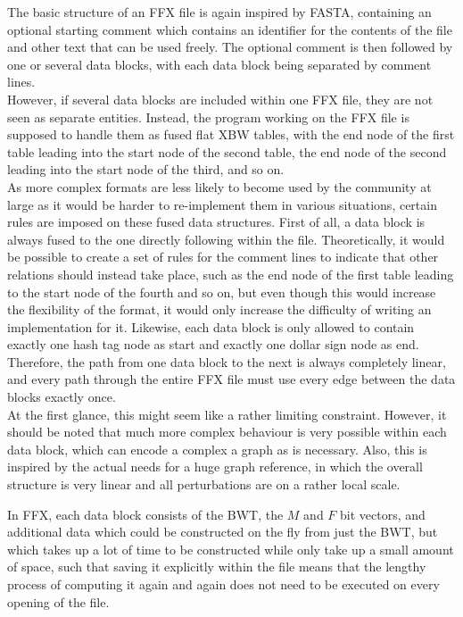 \documentclass[a4paper,12pt,twoside,BCOR=10mm]{scrbook}
\begin{document}
The basic structure of an FFX file is again inspired by FASTA, 
containing an optional starting comment which contains an identifier for 
the contents of the file and other text that can be used freely. 
The optional comment is then followed by one or several data blocks, 
with each data block being separated by comment lines. \\
However, if several data blocks are included within one FFX file, 
they are not seen as separate entities. Instead, the program working on 
the FFX file is supposed to handle them as fused flat XBW tables, 
with the end node of the first table leading into the start node of the 
second table, the end node of the second leading into the start node of the 
third, and so on. \\
As more complex formats are less likely to become 
used by the community at large as it would be harder to re-implement them 
in various situations, certain rules are imposed on these fused data structures. 
First of all, a data block is always fused to the one directly following 
within the file. 
Theoretically, it would be possible to create a set of rules for the comment 
lines to indicate that other relations should instead take place, such as the 
end node of the first table leading to the start node of the fourth and so on, 
but even though this would increase the flexibility of the format, it would only 
increase the difficulty of writing an implementation for it. 
Likewise, each data block is only allowed to contain exactly one hash tag node 
as start and exactly one dollar sign node as end. Therefore, the path from one 
data block to the next is always completely linear, and every path through the 
entire FFX file must use every edge between the data blocks exactly once. \\
At the first glance, this might seem like a rather limiting constraint. 
However, it should be noted that much more complex behaviour is very possible 
within each data block, which can encode a complex a graph as is necessary. 
Also, this is inspired by the actual needs for a huge graph reference, 
in which the overall structure is very linear and all perturbations are on a 
rather local scale.

In FFX, each data block consists of the BWT, the $ M $ and $ F $ bit vectors, 
and additional data which could be constructed on the fly from just the BWT, 
but which takes up a lot of time to be constructed while only take up a small 
amount of space, such that saving it explicitly within the file means that the 
lengthy process of computing it again and again does not need to be executed on 
every opening of the file.
\end{document}
